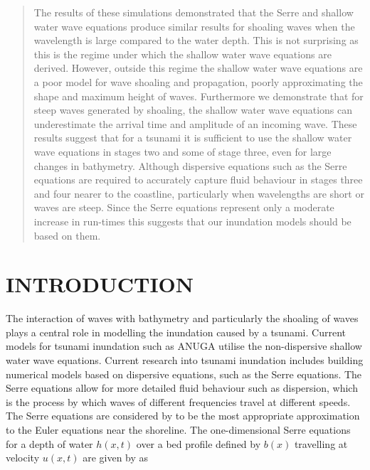 \documentclass[a4paper,fleqn]{article} %
\begin{document}
\begin{abstract}
The results of these simulations demonstrated that the Serre and shallow water wave equations produce similar results for shoaling waves when the wavelength is large compared to the water depth. This is not surprising as this is the regime under which the shallow water wave equations are derived. However, outside this regime the shallow water wave equations are a poor model for wave shoaling and propagation, poorly approximating the shape and maximum height of waves. Furthermore we demonstrate that for steep waves generated by shoaling, the shallow water wave equations can underestimate the arrival time and amplitude of an incoming wave. These results suggest that for a tsunami it is sufficient to use the shallow water wave equations in stages two and some of stage three, even for large changes in bathymetry. Although dispersive equations such as the Serre equations are required to accurately capture fluid behaviour in stages three and four nearer to the coastline, particularly when wavelengths are short or waves are steep. Since the Serre equations represent only a moderate increase in run-times this suggests that our inundation models should be based on them.


\end{abstract} %

\maketitle

\section{INTRODUCTION}

The interaction of waves with bathymetry and particularly the shoaling of waves plays a central role in modelling the inundation caused by a tsunami. Current models for tsunami inundation such as ANUGA utilise the non-dispersive shallow water wave equations. Current research into tsunami inundation includes building numerical models based on dispersive equations, such as the Serre equations. The Serre equations allow for more detailed fluid behaviour such as dispersion, which is the process by which waves of different frequencies travel at different speeds. The Serre equations are considered by \cite{Bonneton-etal-2011-589} to be the most appropriate approximation to the Euler equations near the shoreline. The one-dimensional Serre equations for a depth of water $h(x,t)$ over a bed profile defined by $b(x)$ travelling at velocity $u(x,t)$ are given by \cite{Zoppou-etal-2017} as 
\end{document}
